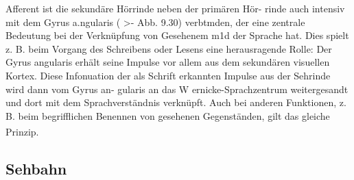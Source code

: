 \documentclass[12pt,a4paper,pdftex]{article}
\begin{document}
Afferent ist die sekundäre Hörrinde neben der primären Hör-
rinde auch intensiv mit dem Gyrus a.ngularis ( >- Abb. 9.30)
verbtmden, der eine zentrale Bedeutung bei der Verknüpfung
von Gesehenem m1d der Sprache hat. Dies spielt z. B. beim Vorgang des Schreibens oder Lesens eine herausragende Rolle:
Der Gyrus angularis erhält seine Impulse vor allem aus dem
sekundären visuellen Kortex. Diese Infonuation der als Schrift
erkannten Impulse aus der Sehrinde wird dann vom Gyrus an-
gularis an das W ernicke-Sprachzentrum weitergesandt und
dort mit dem Sprachverständnis verknüpft. Auch bei anderen
Funktionen, z. B. beim begrifflichen Benennen von gesehenen
Gegenständen, gilt das gleiche Prinzip. \textsuperscript{\cite{trepel2011neuroanatomie}}

\newpage
\subsection{Sehbahn}
\end{document}
